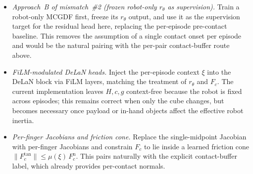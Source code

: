 \documentclass[11pt]{article}
\begin{document}
\begin{itemize}
  \item \emph{Approach~B of mismatch~\#2 (frozen robot-only $r_\theta$
    as supervision).} Train a robot-only MCGDF first, freeze its
    $r_\theta$ output, and use it as the supervision target for the
    residual head here, replacing the per-episode pre-contact baseline.
    This removes the assumption of a single contact onset per episode
    and would be the natural pairing with the per-pair contact-buffer
    route above.
  \item \emph{FiLM-modulated DeLaN heads.} Inject the per-episode
    context $\xi$ into the DeLaN block via FiLM layers, matching the
    treatment of $r_\theta$ and $F_c$. The current implementation
    leaves $H,c,g$ context-free because the robot is fixed across
    episodes; this remains correct when only the cube changes, but
    becomes necessary once payload or in-hand objects affect the
    effective robot inertia.
  \item \emph{Per-finger Jacobians and friction cone.} Replace the
    single-midpoint Jacobian with per-finger Jacobians and constrain
    $F_c$ to lie inside a learned friction cone
    $\|F_c^{\mathrm{tan}}\|\le \mu(\xi)\,F_c^{\mathrm{n}}$. This pairs
    naturally with the explicit contact-buffer label, which already
    provides per-contact normals.
\end{itemize}
\end{document}

